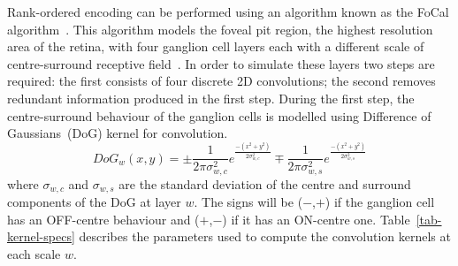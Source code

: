 \documentclass{frontiersENG} %
\begin{document}
Rank-ordered encoding can be performed using an algorithm known as the
{FoCal algorithm~\citep{sen2009evaluating}}.
This algorithm models the foveal pit region, the highest resolution area of the retina, with four ganglion cell layers each with a different scale of centre-surround receptive field~\citep{kolb2003retina}. In order to simulate these layers two steps are required: the first consists of four discrete 2D convolutions; the second removes redundant information produced in the first step. During the first step, the centre-surround behaviour of the ganglion cells is modelled using Difference of Gaussians~(DoG) kernel for convolution. 
\begin{equation}
\label{eq-dog}
DoG_w(x,y) = \pm\frac{1}{2\pi\sigma_{w,c}^2}e^{\frac{-(x^2 + y^2)}{2\sigma_{w,c}^2}}
\mp\frac{1}{2\pi\sigma_{w,s}^2}e^{\frac{-(x^2 + y^2)}{2\sigma_{w,s}^2}}
\end{equation}
where $\sigma_{w,c}$ and $\sigma_{w,s}$ are the standard deviation of the 
centre and surround components of the DoG at layer $w$. The signs 
will be ($-$,$+$) if the ganglion cell has an OFF-centre behaviour and 
($+$,$-$) if it has an ON-centre one. Table~\ref{tab-kernel-specs} 
describes the parameters used to compute the convolution kernels at each 
scale $w$.
\end{document}

